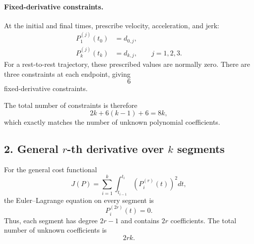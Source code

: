\documentclass[11pt]{article}
\begin{document}
\paragraph{Fixed-derivative constraints.}
At the initial and final times, prescribe velocity, acceleration, and jerk:
\begin{align}
    P_1^{(j)}(t_0)&=d_{0,j}, \\
    P_k^{(j)}(t_k)&=d_{k,j},
    \qquad j=1,2,3.
\end{align}
For a rest-to-rest trajectory, these prescribed values are normally zero.
There are three constraints at each endpoint, giving
\begin{equation}
    6
\end{equation}
fixed-derivative constraints.

The total number of constraints is therefore
\begin{equation}
    \boxed{
    2k+6(k-1)+6=8k,}
\end{equation}
which exactly matches the number of unknown polynomial coefficients.

\subsection*{2. General $r$-th derivative over $k$ segments}

For the general cost functional
\begin{equation}
    J(P)=\sum_{i=1}^{k}
    \int_{t_{i-1}}^{t_i}
    \left(P_i^{(r)}(t)\right)^2dt,
\end{equation}
the Euler--Lagrange equation on every segment is
\begin{equation}
    P_i^{(2r)}(t)=0.
\end{equation}
Thus, each segment has degree $2r-1$ and contains $2r$ coefficients.
The total number of unknown coefficients is
\begin{equation}
    2rk.
\end{equation}
\end{document}
